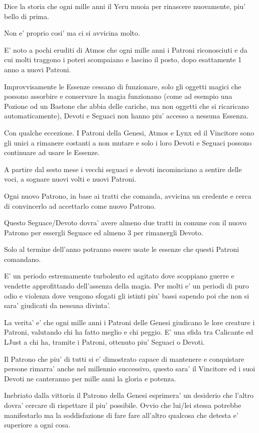 \documentclass[a4paper,11pt,twoside,openany]{book}
\begin{document}
Dice la storia che ogni mille anni il Yeru muoia per rinascere nuovamente, piu' bello di prima.

Non e' proprio cosi' ma ci si avvicina molto.

E' noto a pochi eruditi di Atmos che ogni mille anni i Patroni riconosciuti e da cui molti traggono i poteri scompaiano e lascino il posto, dopo esattamente 1 anno a nuovi Patroni.

Improvvisamente le Essenze cessano di funzionare, solo gli oggetti magici che possono assorbire e conservare la magia funzionano (come ad esempio una Pozione od un Bastone che abbia delle cariche, ma non oggetti che si ricaricano automaticamente), Devoti e Seguaci non hanno piu' accesso a nessuna Essenza.

Con qualche eccezione. I Patroni della Genesi, Atmos e Lynx  ed il Vincitore sono gli unici a rimanere costanti a non mutare e solo i loro Devoti e Seguaci possono continuare ad usare le Essenze.

A partire dal sesto mese i vecchi seguaci e devoti incominciano a sentire delle voci, a sognare nuovi volti e nuovi Patroni.

Ogni nuovo Patrono, in base ai tratti che comanda, avvicina un credente e cerca di convincerlo ad accettarlo come nuovo Patrono.

Questo Seguace/Devoto dovra' avere almeno due tratti in comune con il nuovo Patrono per essergli Seguace ed almeno 3 per rimanergli Devoto.

Solo al termine dell'anno potranno essere usate le essenze che questi Patroni comandano.

E' un periodo estremamente turbolento ed agitato dove scoppiano guerre e vendette approfittando dell'assenza della magia. Per molti e' un periodi di puro odio e violenza dove vengono sfogati gli istinti piu' bassi sapendo poi che non si sara' giudicati da nessuna divinta'.

La verita' e' che ogni mille anni i Patroni delle Genesi giudicano le lore creature i Patroni, valutando chi ha fatto meglio e chi peggio. E' una sfida tra Calicante ed LJust a chi ha, tramite i Patroni, ottenuto piu' Seguaci o Devoti.

Il Patrono che piu' di tutti si e' dimostrato capace di mantenere e conquistare persone rimarra' anche nel millennio successivo, questo sara' il Vincitore ed i suoi Devoti ne canteranno per mille anni la gloria e potenza.

Inebriato dalla vittoria il Patrono della Genesi esprimera' un desiderio che l'altro dovra' cercare di rispettare il piu' possibile. Ovvio che lui/lei stessa potrebbe manifestarlo ma la soddisfazione di fare fare all'altro qualcosa che detesta e' superiore a ogni cosa.
\end{document}
